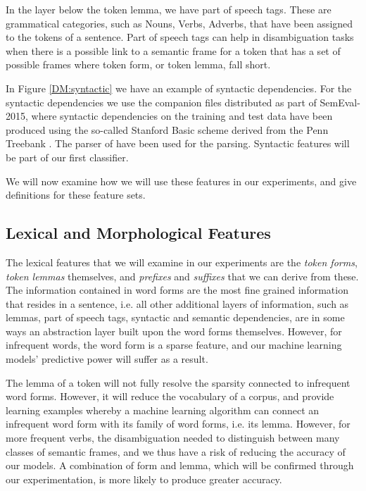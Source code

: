 In the layer below the token lemma, we have part of speech tags. These are grammatical categories, such as Nouns, Verbs, Adverbs, that have been assigned to the tokens of a sentence. Part of speech tags can help in disambiguation tasks when there is a possible link to a semantic frame for a token that has a set of possible frames where token form, or token lemma, fall short.

In Figure \ref{DM:syntactic} we have an example of syntactic dependencies. For the syntactic dependencies we use the companion files distributed as part of SemEval-2015, where syntactic dependencies on the training and test data have been produced using the so-called Stanford Basic scheme derived from the Penn Treebank \cite{PennTreebank}. The parser of  have been used for the parsing. Syntactic features will be part of our first classifier.

We will now examine how we will use these features in our experiments, and give definitions for these feature sets.

\subsection{Lexical and Morphological Features}

The lexical features that we will examine in our experiments are the \textit{token forms}, \textit{token lemmas} themselves, and \textit{prefixes} and \textit{suffixes} that we can derive from these. The information contained in word forms are the most fine grained information that resides in a sentence, i.e. all other additional layers of information, such as lemmas, part of speech tags, syntactic and semantic dependencies, are in some ways an abstraction layer built upon the word forms themselves. However, for infrequent words, the word form is a sparse feature, and our machine learning models' predictive power will suffer as a result.

The lemma of a token will not fully resolve the sparsity connected to infrequent word forms. However, it will reduce the vocabulary of a corpus, and provide learning examples whereby a machine learning algorithm can connect an infrequent word form with its family of word forms, i.e. its lemma. However, for more frequent verbs, the disambiguation needed to distinguish between many classes of semantic frames, and we thus have a risk of reducing the accuracy of our models. A combination of form and lemma, which will be confirmed through our experimentation, is more likely to produce greater accuracy.

